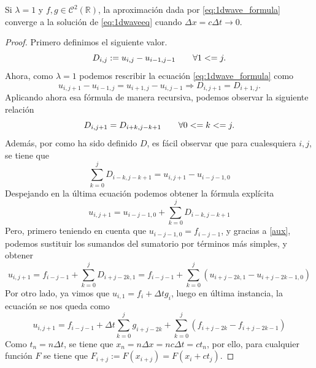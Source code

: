 \begin{teorema}
	Si $\lambda=1$ y $f,g\in\mathscr{C}^2(\mathbb{R})$, la aproximación dada por \ref{eq:1dwave_formula} converge a la solución de \ref{eq:1dwaveeq} cuando $\Delta x = c\Delta t \longrightarrow 0$.
\end{teorema}
\begin{proof}
	Primero definimos el siguiente valor.
	\begin{equation*}
		D_{i,j} := u_{i,j} - u_{i-1,j-1} \hspace{20px} \forall 1<=j.
	\end{equation*}
	Ahora, como $\lambda = 1$ podemos rescribir la ecuación \ref{eq:1dwave_formula} como 
	\begin{equation*}
		u_{i,j+1} - u_{i-1,j} = u_{i+1,j} - u_{i,j-1} \Rightarrow D_{i,j+1} = D_{i+1,j}.
	\end{equation*}
	Aplicando ahora esa fórmula de manera recursiva, podemos observar la siguiente relación
	\begin{equation}
		\label{aux}
		D_{i,j+1} = D_{i+k,j-k+1} \hspace{20px} \forall 0<=k<=j.
	\end{equation}
	Además, por como ha sido definido $D$, es fácil observar que para cualesquiera $i,j$, se tiene que
	\begin{equation*}
		\sum_{k=0}^{j}D_{i-k,j-k+1} = u_{i,j+1} - u_{i-j-1,0}
	\end{equation*}
	Despejando en la última ecuación podemos obtener la fórmula explícita
	\begin{equation*}
		u_{i,j+1} = u_{i-j-1,0} + \sum_{k=0}^{j}D_{i-k,j-k+1}
	\end{equation*}
	Pero, primero teniendo en cuenta que $u_{i-j-1,0}=f_{i-j-1}$, y gracias a \ref{aux}, podemos sustituir los sumandos del sumatorio por términos más simples, y obtener
	\begin{equation*}
		u_{i,j+1} = f_{i-j-1} + \sum_{k=0}^{j}D_{i+j-2k,1} = f_{i-j-1} + \sum_{k=0}^{j}(u_{i+j-2k,1} - u_{i+j-2k-1,0})
	\end{equation*}
	Por otro lado, ya vimos que $u_{i,1} = f_i + \Delta tg_i$, luego en última instancia, la ecuación se nos queda como
	\begin{equation}
		\label{aux2}
		u_{i,j+1} = f_{i-j-1} + \Delta t\sum_{k=0}^{j}g_{i+j-2k} + \sum_{k=0}^{j}(f_{i+j-2k}-f_{i+j-2k-1})
	\end{equation}
	Como $t_n=n\Delta t$, se tiene que $x_n=n\Delta x=nc\Delta t=ct_{n}$, por ello, para cualquier función $F$ se tiene que $F_{i+j}:=F(x_{i+j})=F(x_i+ct_j)$.
	

\end{proof}
